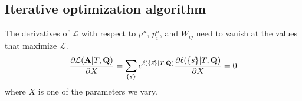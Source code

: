 \documentclass[aps,rmp,twocolumn,linenumbers]{revtex4-1}
\newcommand{\mat}[1]{{\bf #1}}
\newcommand{\eqp}{p}
\newcommand{\LH}{\mathcal{L}}
\newcommand{\lh}{\ell}
\begin{document}

\subsection*{Iterative optimization algorithm}
The derivatives of $\LH$ with respect to $\mu^a$, $\eqp_i^a$, and $W_{ij}$ need to vanish at the values that maximize $\LH$.
\begin{equation}
	\frac{\partial \LH(\mat{A}|T,\mat{Q})}{\partial X} = \sum_{\{\vec{s}\}} e^{\lh(\{\vec{s}\} |T, \mat{Q})} \frac{\partial \ell(\{\vec{s}\}|T,\mat{Q})}{\partial X} = 0
\end{equation}
where $X$ is one of the parameters we vary.
\end{document}
